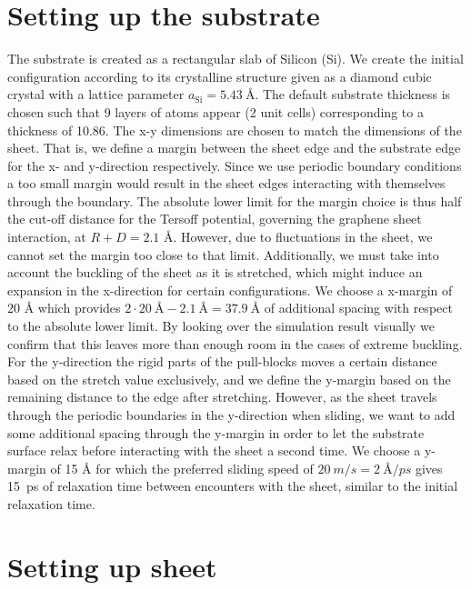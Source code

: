 \section{Setting up the substrate}\label{sec:substrate}
The substrate is created as a rectangular slab of Silicon (Si). We create the
initial configuration according to its crystalline structure given as a diamond
cubic crystal with a lattice parameter $a_{\text{Si}} = \SI{5.43}{\text{Å}}$.
The default substrate thickness is chosen such that 9 layers of atoms appear (2
unit cells) corresponding to a thickness of \SI{10.86}{}. The x-y
dimensions are chosen to match the dimensions of the sheet. That is, we define a
margin between the sheet edge and the substrate edge for the x- and y-direction
respectively. Since we use periodic boundary conditions a too small margin would
result in the sheet edges interacting with themselves through the boundary. The
absolute lower limit for the margin choice is thus half the cut-off distance for
the Tersoff potential, governing the graphene sheet interaction, at $R + D =
2.1$ Å. However, due to fluctuations in the sheet, we cannot set the margin too
close to that limit. Additionally, we must take into account the buckling of the
sheet as it is stretched, which might induce an expansion in the x-direction for
certain configurations. We choose a x-margin of 20 Å which provides $2\cdot
\SI{20}{\text{Å}} - \SI{2.1}{\text{Å}} = \SI{37.9}{\text{Å}}$ of additional
spacing with respect to the absolute lower limit. By looking over the simulation
result visually we confirm that this leaves more than enough room in the cases
of extreme buckling. For the y-direction the rigid parts of the pull-blocks
moves a certain distance based on the stretch value exclusively, and we define
the y-margin based on the remaining distance to the edge after stretching.
However, as the sheet travels through the periodic boundaries in the y-direction
when sliding, we want to add some additional spacing through the y-margin in
order to let the substrate surface relax before interacting with the sheet a
second time. We choose a y-margin of 15 Å for which the preferred sliding speed
of $\SI{20}{m/s} = \SI{2}{\text{Å}/ps}$ gives \SI{15}{ps} of relaxation time
between encounters with the sheet, similar to the initial relaxation time. 


\section{Setting up sheet}

